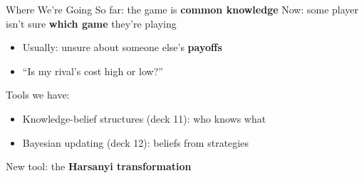 \newcommand{\harsanyitree}[1][0.82]{%
\begin{gametree}[player names={1, 2}, labels=short, scale=#1]
  \branch[player=0, root=w, label=90] from (0,0) to[v=1.2, h=5.0] {type $a$\ $\frac23$; type $b$\ $\frac13$};
  \branch[player=1, label=180] from (w1) to[v=1.3, h=2.4] {T; B};
  \branch[player=1, label=0] from (w2) to {T; B};
  \branch[player=2, label=none] from (w11) to[v=1.4, h=1.1] {L(0,3); R(3,9)};
  \branch[label=none] from (w12) to {L(3,3); R(0,0)};
  \branch[label=none] from (w21) to {L(6,3); R(0,9)};
  \branch[label=none] from (w22) to {L(3,3); R(3,0)};
  \informset[player=2] (w11) -- (w22);
\end{gametree}}

\newcommand{\twosidedtree}[1][0.66]{%
\begin{gametree}[player names={1, 2}, labels=short, scale=#1]
  \branch[player=0, root=w, label=90] from (0,0) to[v=1.2, h=5.6] {$\alpha$\ $\frac24$; $\beta$\ $\frac14$; $\gamma$\ $\frac14$};
  \branch[player=1, label=180] from (w1) to[v=1.3, h=2.6] {A; B};
  \branch[player=1, label=none] from (w2) to {A; B};
  \branch[player=1, label=none] from (w3) to {A; B};
  \branch[player=2, label=none] from (w11) to[v=1.4, h=1.25] {C(1,3); D(0,1)};
  \branch[label=none] from (w12) to {C(0,0); D(3,1)};
  \branch[label=none] from (w21) to {C(1,3); D(0,1)};
  \branch[label=none] from (w22) to {C(0,0); D(3,1)};
  \branch[label=none] from (w31) to {C(1,0); D(0,2)};
  \branch[label=none] from (w32) to {C(0,0); D(3,1)};
  \informset[player=1] (w2) -- (w3);
  \informset[player=2] (w11) -- (w22);
  \informset[player=2] (w31) -- (w32);
\end{gametree}}



\frame{\maketitle}

\begin{frame}{Where We're Going}
So far: the game is \textbf{common knowledge}
\bsk
Now: some player isn't sure \textbf{which game} they're playing
\begin{itemize}
    \item Usually: unsure about someone else's \textbf{payoffs}
    \item ``Is my rival's cost high or low?''
\end{itemize}
\bsk
Tools we have:
\begin{itemize}
    \item Knowledge-belief structures (deck 11): who knows what
    \item Bayesian updating (deck 12): beliefs from strategies
\end{itemize}
\bsk
New tool: the \textbf{Harsanyi transformation}
\vspace{-0.3in}
\end{frame}

